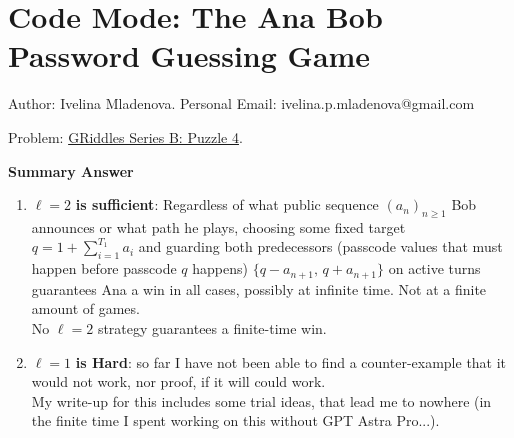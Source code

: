 \chapter{Code Mode: The Ana Bob Password Guessing Game}

\noindent
Author: Ivelina Mladenova.
\noindent
Personal Email: ivelina.p.mladenova@gmail.com


\noindent
Problem: \href{https://www.gresearch.com/griddles/series-b-puzzle-4/}{GRiddles Series B: Puzzle 4}.
\begin{resultbox}

\textbf{Summary Answer}

\begin{enumerate}[label=(\arabic*)] 

\item $\mathbf{\ell = }2 $ \textbf{is sufficient}: Regardless of what public sequence $(a_n)_{n\ge 1}$ Bob announces or what path he plays, choosing some fixed target $q = 1 + \sum_{i=1}^{T_1} a_i$ and guarding both predecessors (passcode values that must happen before passcode $q$ happens) $\{q - a_{n+1}, \, q + a_{n+1}\}$ on active turns guarantees Ana a win in all cases, possibly at infinite time. Not at a finite amount of games. \\ No \(\ell=2\) strategy guarantees a finite-time win.

\item $\mathbf{\ell = } 1$ \textbf{is Hard}: so far I have not been able to find a counter-example that it would not work, nor proof, if it will could work. \\ My write-up for this includes some trial ideas, that lead me to nowhere (in the finite time I spent working on this without GPT Astra Pro...).


\end{enumerate}
\end{resultbox}

